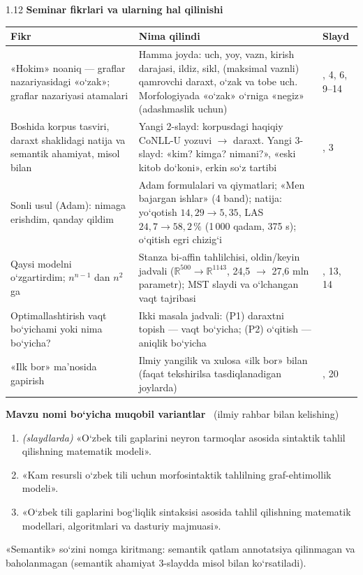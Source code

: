 \documentclass[14pt,a4paper]{extarticle}
\begin{document}
\begin{spacing}{1.12}
\newpage
\noindent\textbf{Seminar fikrlari va ularning hal qilinishi}\\[2pt]
{\small
\begin{tabular}{@{}>{\raggedright\arraybackslash}p{5.1cm}>{\raggedright\arraybackslash}p{7.9cm}>{\raggedright\arraybackslash}p{1.9cm}@{}}
  \toprule
  \textbf{Fikr} & \textbf{Nima qilindi} & \textbf{Slayd}\\
  \midrule
  «Hokim» noaniq --- graflar nazariyasidagi «o‘zak»; graflar nazariyasi atamalari
    & Hamma joyda: uch, yoy, vazn, kirish darajasi, ildiz, sikl, (maksimal vaznli) qamrovchi
      daraxt, o‘zak va tobe uch. Morfologiyada «o‘zak» o‘rniga «negiz» (adashmaslik uchun)
    & 2, 4, 6, 9--14\\
  Boshida korpus tasviri, daraxt shaklidagi natija va semantik ahamiyat, misol bilan
    & Yangi 2-slayd: korpusdagi haqiqiy CoNLL-U yozuvi $\to$ daraxt. Yangi 3-slayd: «kim? kimga?
      nimani?», «eski kitob do‘koni», erkin so‘z tartibi
    & 2, 3\\
  Sonli usul (Adam): nimaga erishdim, qanday qildim
    & Adam formulalari va qiymatlari; «Men bajargan ishlar» (4 band); natija: yo‘qotish
      $14{,}29\to5{,}35$, LAS $24{,}7\to58{,}2\,\%$ (1\,000 qadam, 375 s); o‘qitish egri chizig‘i
    & 15\\
  Qaysi modelni o‘zgartirdim; $n^{n-1}$ dan $n^2$ ga
    & Stanza bi-affin tahlilchisi, oldin/keyin jadvali ($\mathbb R^{500}\to\mathbb R^{1143}$,
      24,5 $\to$ 27,6 mln parametr); MST slaydi va o‘lchangan vaqt tajribasi
    & 9, 13, 14\\
  Optimallashtirish vaqt bo‘yichami yoki nima bo‘yicha?
    & Ikki masala jadvali: (P1) daraxtni topish --- vaqt bo‘yicha; (P2) o‘qitish --- aniqlik bo‘yicha
    & 12\\
  «Ilk bor» ma’nosida gapirish
    & Ilmiy yangilik va xulosa «ilk bor» bilan (faqat tekshirilsa tasdiqlanadigan joylarda)
    & 8, 20\\
  \bottomrule
\end{tabular}}

\vspace{0.8em}
\noindent\textbf{Mavzu nomi bo‘yicha muqobil variantlar} \ {\small (ilmiy rahbar bilan kelishing)}
\begin{enumerate}[itemsep=1pt]
  \item \textit{(slaydlarda)} «O‘zbek tili gaplarini neyron tarmoqlar asosida sintaktik tahlil
        qilishning matematik modeli».
  \item «Kam resursli o‘zbek tili uchun morfosintaktik tahlilning graf-ehtimollik modeli».
  \item «O‘zbek tili gaplarini bog‘liqlik sintaksisi asosida tahlil qilishning matematik
        modellari, algoritmlari va dasturiy majmuasi».
\end{enumerate}
{\small «Semantik» so‘zini nomga kiritmang: semantik qatlam annotatsiya qilinmagan va baholanmagan
(semantik ahamiyat 3-slaydda misol bilan ko‘rsatiladi).}


\end{spacing}
\end{document}
